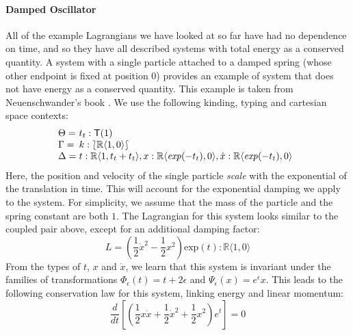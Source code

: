 \documentclass{sigplanconf}
\newcommand{\typeOfCartSp}[1]{\lbag #1 \rbag}
\theoremstyle{examplestyle}
\begin{document}

\paragraph{Damped Oscillator} All of the example Lagrangians we have
looked at so far have had no dependence on time, and so they have all
described systems with total energy as a conserved quantity. A system
with a single particle attached to a damped spring (whose other
endpoint is fixed at position $0$) provides an example of system that
does not have energy as a conserved quantity. This example is taken
from Neuenschwander's book \cite{neuenschwander11}.  We use the
following kinding, typing and cartesian space contexts:
\begin{displaymath}
  \begin{array}{l@{\hspace{0.3em}}l}
    \Theta = & t_t : \mathsf{T}(1) \\
    \Gamma = & k : \typeOfCartSp{\mathbb{R}\langle 1, 0 \rangle} \\
    \Delta = &
    \begin{array}[t]{@{}l}
      t : \mathbb{R}\langle 1, t_t + t_t \rangle, x : \mathbb{R}\langle \mathit{exp}(-t_t), 0 \rangle, \dot{x} : \mathbb{R}\langle \mathit{exp}(-t_t), 0 \rangle
    \end{array}
  \end{array}
\end{displaymath}
Here, the position and velocity of the single particle \emph{scale}
with the exponential of the translation in time. This will account for
the exponential damping we apply to the system. For simplicity, we
assume that the mass of the particle and the spring constant are both
$1$. The Lagrangian for this system looks similar to the coupled pair
above, except for an additional damping factor:
\begin{displaymath}
  L = \left(\frac{1}{2}\dot{x}^2 - \frac{1}{2}x^2\right)\mathrm{exp}(t) : \mathbb{R}\langle 1, 0 \rangle
\end{displaymath}
From the types of $t$, $x$ and $\dot{x}$, we learn that this system is
invariant under the families of transformations $\Phi_\epsilon(t) = t
+ 2\epsilon$ and $\Psi_\epsilon(x) = e^\epsilon x$. This leads to the
following conservation law for this system, linking energy and linear
momentum:
\begin{displaymath}
  \frac{d}{dt}\left[\left(\frac{1}{2}x\dot{x} + \frac{1}{2}\dot{x}^2 + \frac{1}{2}x^2\right)e^t\right] = 0
\end{displaymath}
\end{document}
